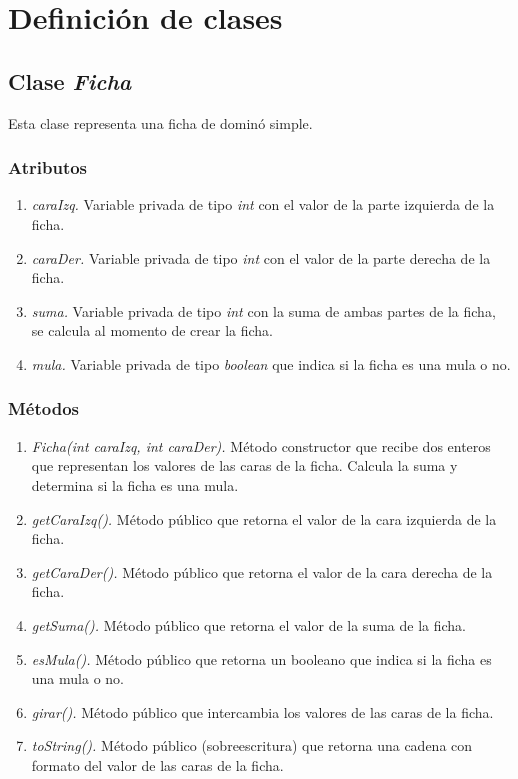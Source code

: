 \documentclass[12pt]{article}
\begin{document}
  \section{Definición de clases}
  \subsection{Clase \textit{Ficha}}
  Esta clase representa una ficha de dominó simple. 

  \subsubsection{Atributos}
  \begin{enumerate}
    \item \textit{caraIzq.} Variable privada de tipo \textit{int} con el valor de la parte izquierda de la ficha.
    \item \textit{caraDer.} Variable privada de tipo \textit{int} con el valor de la parte derecha de la ficha.
    \item \textit{suma.} Variable privada de tipo \textit{int} con la suma de ambas partes de la ficha, se calcula al momento de crear la ficha.
    \item \textit{mula.} Variable privada de tipo \textit{boolean} que indica si la ficha es una mula o no.
  \end{enumerate}

  \subsubsection{Métodos}
  \begin{enumerate}
    \item \textit{Ficha(int caraIzq, int caraDer).} Método constructor que recibe dos enteros que representan los valores de las caras de la ficha. Calcula la suma y determina si la ficha es una mula.
    \item \textit{getCaraIzq().} Método público que retorna el valor de la cara izquierda de la ficha.
    \item \textit{getCaraDer().} Método público que retorna el valor de la cara derecha de la ficha.
    \item \textit{getSuma().} Método público que retorna el valor de la suma de la ficha.
    \item \textit{esMula().} Método público que retorna un booleano que indica si la ficha es una mula o no. 
    \item \textit{girar().} Método público que intercambia los valores de las caras de la ficha.
    \item \textit{toString().} Método público (sobreescritura) que retorna una cadena con formato del valor de las caras de la ficha.
  \end{enumerate}
\end{document}
